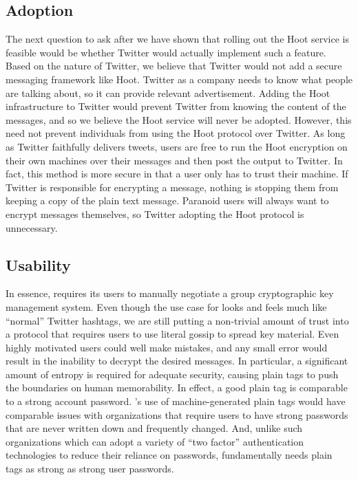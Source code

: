 \subsection{Adoption}	

The next question to ask after we have shown that rolling out the Hoot service is feasible would be whether Twitter would actually implement such a feature. Based on the nature of Twitter, we believe that Twitter would not add a secure messaging framework like Hoot. Twitter as a company needs to know what people are talking about, so it can provide relevant advertisement. Adding the Hoot infrastructure to Twitter would prevent Twitter from knowing the content of the messages, and so we believe the Hoot service will never be adopted. However, this need not prevent individuals from using the Hoot protocol over Twitter. As long as Twitter faithfully delivers tweets, users are free to run the Hoot encryption on their own machines over their messages and then post the output to Twitter. In fact, this method is more secure in that a user only has to trust their machine. If Twitter is responsible for encrypting a message, nothing is stopping them from keeping a copy of the plain text message. Paranoid users will always want to encrypt messages themselves, so Twitter adopting the Hoot protocol is unnecessary.
\fi
		
\subsection{Usability}

In essence, \hoot requires its users to manually negotiate a group cryptographic key management system. Even though the use case for \hoot looks and feels much like ``normal'' Twitter hashtags, we are still putting a non-trivial amount of trust into a protocol that requires users to use literal gossip to spread key material. Even highly motivated users could well make mistakes, and any small error would result in the inability to decrypt the desired \hoot messages. In particular, a significant amount of entropy is required for adequate security, causing \hoot plain tags to push the boundaries on human memorability. In effect, a good \hoot plain tag is comparable to a strong account password. \hoot's use of machine-generated plain tags would have comparable issues with organizations that require users to have strong passwords that are never written down and frequently changed.  And, unlike such organizations which can adopt a variety of ``two factor'' authentication technologies to reduce their reliance on passwords, \hoot fundamentally needs plain tags as strong as strong user passwords.

